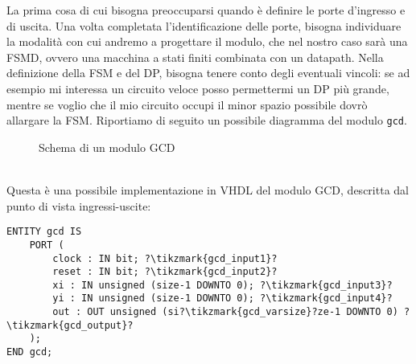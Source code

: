 \documentclass[10pt,a4paper,oneside]{scrbook}
\begin{document}
\noindent
La prima cosa di cui bisogna preoccuparsi quando è definire le porte d'ingresso e di uscita. Una volta completata
l'identificazione delle porte, bisogna individuare la modalità con cui andremo a progettare il modulo,
che nel nostro caso sarà una FSMD, ovvero una macchina a stati finiti combinata con un datapath. 
Nella definizione della FSM e del DP, bisogna tenere conto degli eventuali vincoli: se ad esempio mi interessa un circuito veloce posso permettermi un DP più grande, mentre se voglio che il mio circuito occupi il minor spazio possibile dovrò allargare la FSM.
Riportiamo di seguito un possibile diagramma del modulo \texttt{gcd}.
\begin{figure}[h]
    \centering
    \label{img:gcd_scheme}
    \caption{Schema di un modulo GCD}
\end{figure}
\\
Questa è una possibile implementazione in VHDL del modulo GCD, descritta dal punto di vista ingressi-uscite:
\begin{verbatim}
ENTITY gcd IS
    PORT (
        clock : IN bit; ?\tikzmark{gcd_input1}?
        reset : IN bit; ?\tikzmark{gcd_input2}?
        xi : IN unsigned (size-1 DOWNTO 0); ?\tikzmark{gcd_input3}?
        yi : IN unsigned (size-1 DOWNTO 0); ?\tikzmark{gcd_input4}?
        out : OUT unsigned (si?\tikzmark{gcd_varsize}?ze-1 DOWNTO 0) ?\tikzmark{gcd_output}?
    );
END gcd;
\end{verbatim}
\end{document}
